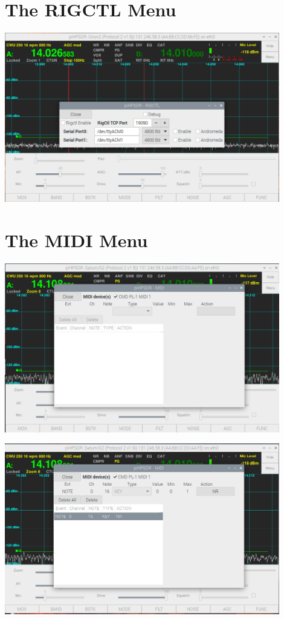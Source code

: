 \documentclass[12pt]{book}
\begin{document}
\section{The RIGCTL Menu}
\begin{center}
\includegraphics[width=12cm]{RigCtlMenu.png}
\end{center}

\section{The MIDI Menu}
\begin{center}
\includegraphics[width=12cm]{MIDImenu1.png}
\end{center}

\begin{center}
\includegraphics[width=12cm]{MIDImenu2.png}
\end{center}
\end{document}
